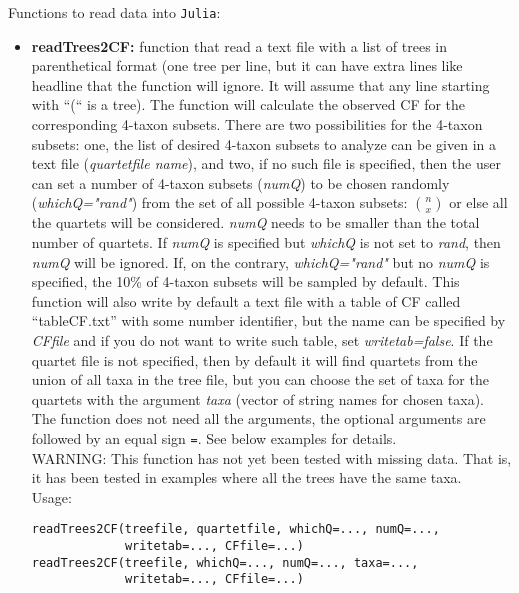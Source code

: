 \documentclass[12pt]{article}
\begin{document}
\noindent Functions to read data into \texttt{Julia}:
\begin{itemize}
\item \textbf{readTrees2CF:} function that read a text file with a
  list of trees in parenthetical format (one tree per line, but it can
  have extra lines like headline that the function will ignore. It
  will assume that any line starting with ``(`` is a tree). The
  function will calculate the observed CF for the corresponding
  4-taxon subsets. There are two possibilities for the 4-taxon subsets: one, the
  list of desired 4-taxon subsets to analyze can be given in a text file
  (\textit{quartetfile name}), and two, if no such file is specified,
  then the user can set a number of 4-taxon subsets (\textit{numQ}) to
  be chosen randomly (\textit{whichQ="rand"})
  from the set of all possible 4-taxon subsets: $n \choose x$ or else all the
  quartets will be considered. \textit{numQ} needs to be
  smaller than the total number of quartets. If \textit{numQ} is
  specified but \textit{whichQ} is not set to \textit{rand}, then
  \textit{numQ} will be ignored. If, on the contrary,
  \textit{whichQ="rand"} but no \textit{numQ} is specified, the 10\%
  of 4-taxon subsets will be sampled by default.
  This function will also write by default a text file
  with a table of CF called ``tableCF.txt'' with some number identifier, but the name can be
  specified by \textit{CFfile} and if you do not want to write such table,
  set \textit{writetab=false}. If the quartet file is not specified, then by
  default it will find quartets from the union of all taxa in the tree
  file, but you can choose the set of taxa for the quartets with the
  argument \textit{taxa} (vector of string names for chosen taxa).  The function does not need all the
  arguments, the optional arguments are followed by an equal sign \texttt{=}.
  See below examples for details.
  \\

  WARNING: This function has not yet been tested with missing
  data. That is, it has been tested in
  examples where all the trees have the same taxa.\\
  Usage:
\begin{lstlisting}
readTrees2CF(treefile, quartetfile, whichQ=..., numQ=...,
             writetab=..., CFfile=...)
readTrees2CF(treefile, whichQ=..., numQ=..., taxa=...,
             writetab=..., CFfile=...)
\end{lstlisting}


\end{itemize}
\end{document}
